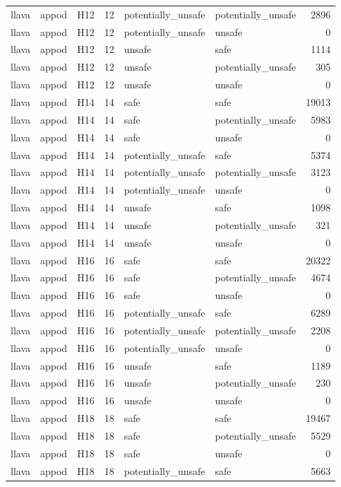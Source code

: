 \begin{table}[tbp]
\begin{tabular}{lllrllr}
llava & appod & H12 & 12 & potentially\_unsafe & potentially\_unsafe & 2896 \\
llava & appod & H12 & 12 & potentially\_unsafe & unsafe & 0 \\
llava & appod & H12 & 12 & unsafe & safe & 1114 \\
llava & appod & H12 & 12 & unsafe & potentially\_unsafe & 305 \\
llava & appod & H12 & 12 & unsafe & unsafe & 0 \\
llava & appod & H14 & 14 & safe & safe & 19013 \\
llava & appod & H14 & 14 & safe & potentially\_unsafe & 5983 \\
llava & appod & H14 & 14 & safe & unsafe & 0 \\
llava & appod & H14 & 14 & potentially\_unsafe & safe & 5374 \\
llava & appod & H14 & 14 & potentially\_unsafe & potentially\_unsafe & 3123 \\
llava & appod & H14 & 14 & potentially\_unsafe & unsafe & 0 \\
llava & appod & H14 & 14 & unsafe & safe & 1098 \\
llava & appod & H14 & 14 & unsafe & potentially\_unsafe & 321 \\
llava & appod & H14 & 14 & unsafe & unsafe & 0 \\
llava & appod & H16 & 16 & safe & safe & 20322 \\
llava & appod & H16 & 16 & safe & potentially\_unsafe & 4674 \\
llava & appod & H16 & 16 & safe & unsafe & 0 \\
llava & appod & H16 & 16 & potentially\_unsafe & safe & 6289 \\
llava & appod & H16 & 16 & potentially\_unsafe & potentially\_unsafe & 2208 \\
llava & appod & H16 & 16 & potentially\_unsafe & unsafe & 0 \\
llava & appod & H16 & 16 & unsafe & safe & 1189 \\
llava & appod & H16 & 16 & unsafe & potentially\_unsafe & 230 \\
llava & appod & H16 & 16 & unsafe & unsafe & 0 \\
llava & appod & H18 & 18 & safe & safe & 19467 \\
llava & appod & H18 & 18 & safe & potentially\_unsafe & 5529 \\
llava & appod & H18 & 18 & safe & unsafe & 0 \\
llava & appod & H18 & 18 & potentially\_unsafe & safe & 5663 \\

\end{tabular}
\end{table}
